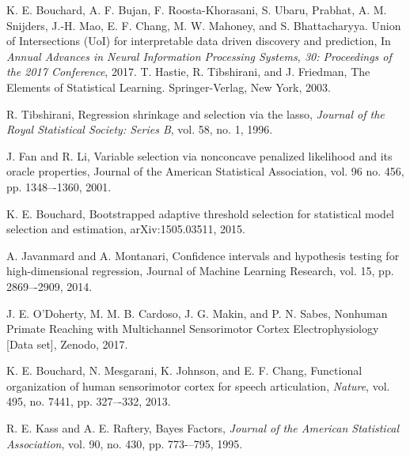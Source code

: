 \documentclass[letterpaper, 10 pt, conference]{ieeeconf}  %
\begin{document}
\begin{thebibliography}{99}

 K. E. Bouchard, A. F. Bujan, F. Roosta-Khorasani, S. Ubaru, Prabhat, A. M. Snijders, J.-H. Mao, E. F. Chang, M. W. Mahoney, and S. Bhattacharyya. Union of Intersections (UoI) for interpretable data driven discovery and prediction, In \textit{Annual Advances in Neural Information Processing Systems, 30: Proceedings of the 2017 Conference}, 2017.
 T. Hastie, R. Tibshirani, and J. Friedman, The Elements of Statistical Learning. Springer-Verlag, New York, 2003.

 R. Tibshirani, Regression shrinkage and selection via the lasso, \textit{Journal of the Royal Statistical Society: Series B}, vol. 58, no. 1, 1996.

 J. Fan and R. Li, Variable selection via nonconcave penalized likelihood and its oracle properties, Journal of the American Statistical Association, vol. 96 no. 456, pp. 1348–-1360, 2001.

 K. E. Bouchard, Bootstrapped adaptive threshold selection for statistical model selection and estimation, arXiv:1505.03511, 2015.

 A. Javanmard and A. Montanari, Confidence intervals and hypothesis testing for high-dimensional regression, Journal of Machine Learning Research, vol. 15, pp. 2869–-2909, 2014.

 J. E. O'Doherty, M. M. B. Cardoso, J. G. Makin, and P. N. Sabes, Nonhuman Primate Reaching with Multichannel Sensorimotor Cortex Electrophysiology [Data set], Zenodo, 2017.

 K. E. Bouchard, N. Mesgarani, K. Johnson, and E. F. Chang, Functional organization of human sensorimotor cortex for speech articulation, \textit{Nature}, vol. 495, no. 7441, pp. 327–-332, 2013.

 R. E. Kass and A. E. Raftery, Bayes Factors, \textit{Journal of the American Statistical Association}, vol. 90, no. 430, pp. 773-–795, 1995.






\end{thebibliography}
\end{document}
